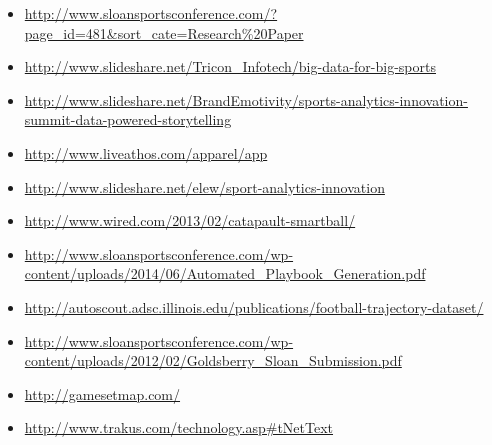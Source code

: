 \begin{itemize}
\item
  \url{http://www.sloansportsconference.com/?page_id=481\&sort_cate=Research\%20Paper}
\item
  \url{http://www.slideshare.net/Tricon_Infotech/big-data-for-big-sports}
\item
  \url{http://www.slideshare.net/BrandEmotivity/sports-analytics-innovation-summit-data-powered-storytelling}
\item
  \url{http://www.liveathos.com/apparel/app}
\item
  \url{http://www.slideshare.net/elew/sport-analytics-innovation}
\item
  \url{http://www.wired.com/2013/02/catapault-smartball/}
\item
  \url{http://www.sloansportsconference.com/wp-content/uploads/2014/06/Automated_Playbook_Generation.pdf}
\item
  \url{http://autoscout.adsc.illinois.edu/publications/football-trajectory-dataset/}
\item
  \url{http://www.sloansportsconference.com/wp-content/uploads/2012/02/Goldsberry_Sloan_Submission.pdf}
\item
  \url{http://gamesetmap.com/}
\item
  \url{http://www.trakus.com/technology.asp\#tNetText}
\end{itemize}
